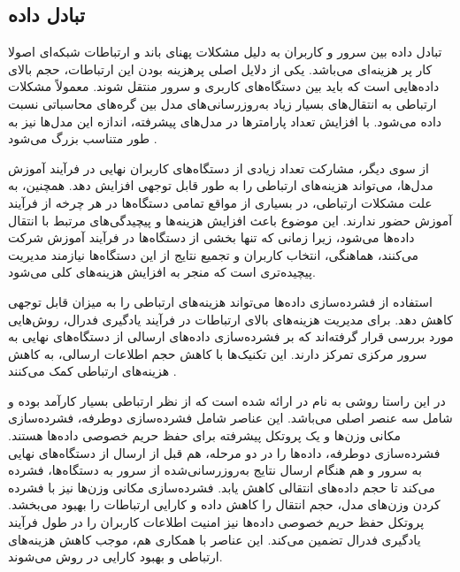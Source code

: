 \subsection{تبادل داده}
تبادل داده بین سرور و کاربران به دلیل مشکلات پهنای باند و ارتباطات شبکه‌ای اصولا کار پر هزینه‌ای می‌باشد. یکی از دلایل اصلی پرهزینه بودن این ارتباطات، حجم بالای داده‌هایی است که باید بین دستگاه‌های کاربری و سرور منتقل شوند.
معمولاً مشکلات ارتباطی به انتقال‌های بسیار زیاد به‌روزرسانی‌های مدل بین گره‌های محاسباتی نسبت داده می‌شود. با افزایش تعداد پارامترها در مدل‌های پیشرفته، اندازه این مدل‌ها نیز به طور متناسب بزرگ می‌شود
\cite{wang2018atomo}.

از سوی دیگر، مشارکت تعداد زیادی از دستگاه‌های کاربران نهایی در فرآیند آموزش مدل‌ها، می‌تواند هزینه‌های ارتباطی را به طور قابل توجهی افزایش دهد. همچنین، به علت مشکلات ارتباطی، در بسیاری از مواقع تمامی دستگاه‌ها در هر چرخه از فرآیند آموزش حضور ندارند. این موضوع باعث افزایش هزینه‌ها و پیچیدگی‌های مرتبط با انتقال داده‌ها می‌شود، زیرا زمانی که تنها بخشی از دستگاه‌ها در فرآیند آموزش شرکت می‌کنند، هماهنگی، انتخاب کاربران و تجمیع نتایج از این دستگاه‌ها نیازمند مدیریت پیچیده‌تری است که منجر به افزایش هزینه‌های کلی می‌شود.


استفاده از فشرده‌سازی داده‌ها می‌تواند هزینه‌های ارتباطی را به میزان قابل توجهی کاهش دهد. برای مدیریت هزینه‌های بالای ارتباطات در فرآیند یادگیری فدرال، روش‌هایی مورد بررسی قرار گرفته‌اند که بر فشرده‌سازی داده‌های ارسالی از دستگاه‌های نهایی به سرور مرکزی تمرکز دارند. این تکنیک‌ها با کاهش حجم اطلاعات ارسالی، به کاهش هزینه‌های ارتباطی کمک می‌کنند
\cite{konevcny2016federated}.

در این راستا روشی به نام
%
در
\cite{fang2021privacy}
ارائه شده است که از نظر ارتباطی بسیار کارآمد بوده و شامل سه عنصر اصلی می‌باشد. این عناصر شامل فشرده‌سازی دوطرفه، فشرده‌سازی مکانی وزن‌ها و یک پروتکل پیشرفته برای حفظ حریم خصوصی داده‌ها هستند. فشرده‌سازی دوطرفه، داده‌ها را در دو مرحله، هم قبل از ارسال از دستگاه‌های نهایی به سرور و هم هنگام ارسال نتایج به‌روزرسانی‌شده از سرور به دستگاه‌ها، فشرده می‌کند تا حجم داده‌های انتقالی کاهش یابد. فشرده‌سازی مکانی وزن‌ها نیز با فشرده کردن وزن‌های مدل، حجم انتقال را کاهش داده و کارایی ارتباطات را بهبود می‌بخشد. پروتکل حفظ حریم خصوصی داده‌ها نیز امنیت اطلاعات کاربران را در طول فرآیند یادگیری فدرال تضمین می‌کند. این عناصر با همکاری هم، موجب کاهش هزینه‌های ارتباطی و بهبود کارایی در روش
می‌شوند.



